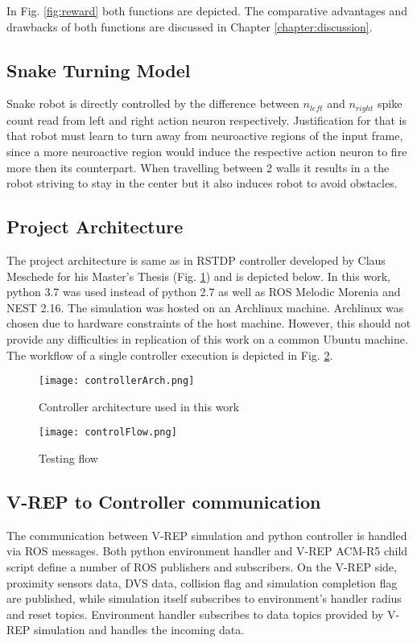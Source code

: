 In Fig. \ref{fig:reward} both functions are depicted. The comparative advantages and drawbacks of both functions are discussed in Chapter \ref{chapter:discussion}.

\subsection{Snake Turning Model}
Snake robot is directly controlled by the difference between \(n_{left}\) and \(n_{right}\) spike count read from left and right action neuron respectively. Justification for that is that robot must learn to turn away from neuroactive regions of the input frame, since a more neuroactive region would induce the respective action neuron to fire more then its counterpart. When travelling between 2 walls it results in a the robot striving to stay in the center but it also induces robot to avoid obstacles.

\subsection{Project Architecture}

The project architecture is same as in RSTDP controller developed by Claus Meschede for his Master's Thesis \cite{11} (Fig. \ref{fig:controllerArch}) and is depicted below. In this work, python 3.7 was used instead of python 2.7 as well as ROS Melodic Morenia and NEST 2.16. The simulation was hosted on an Archlinux machine. Archlinux was chosen due to hardware constraints of the host machine. However, this should not provide any difficulties in replication of this work on a common Ubuntu machine. The workflow of a single controller execution is depicted in Fig. \ref{fig:controlFlow}.

\begin{figure}[h]
	\centering
	\texttt{[image: controllerArch.png]} 
	\caption{Controller architecture used in this work}
	\label{fig:controllerArch}
\end{figure}
\begin{figure}[h]
	\centering
	\texttt{[image: controlFlow.png]} 
	\caption{Testing flow}
	\label{fig:controlFlow}
\end{figure}

\subsection{V-REP to Controller communication}
The communication between V-REP simulation and python controller is handled via ROS messages. Both python environment handler and V-REP ACM-R5 child script define a number of ROS publishers and subscribers. On the V-REP side, proximity sensors data, DVS data, collision flag and simulation completion flag are published, while simulation itself subscribes to environment's handler radius and reset topics. Environment handler subscribes to data topics provided by V-REP simulation and handles the incoming data.